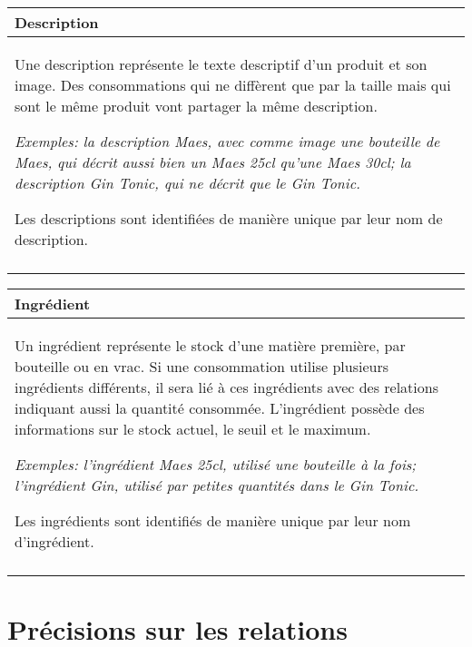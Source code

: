 \documentclass[a4paper,10pt]{article}
\begin{document}
\begin{tabu}{X}
\textbf{Description} \\
\toprule

Une description représente le texte descriptif d'un produit et son image. Des consommations qui ne diffèrent que par la taille mais qui sont le même produit vont partager la même description.

\textsl{Exemples: la description Maes, avec comme image une bouteille de Maes, qui décrit aussi bien un Maes 25cl qu'une Maes 30cl; la description Gin Tonic, qui ne décrit que le Gin Tonic.}

Les descriptions sont identifiées de manière unique par leur nom de description. \\\\
\end{tabu}

\begin{tabu}{X}
\textbf{Ingrédient} \\
\toprule

Un ingrédient représente le stock d'une matière première, par bouteille ou en vrac. Si une consommation utilise plusieurs ingrédients différents, il sera lié à ces ingrédients avec des relations indiquant aussi la quantité consommée. L'ingrédient possède des informations sur le stock actuel, le seuil et le maximum.

\textsl{Exemples: l'ingrédient Maes 25cl, utilisé une bouteille à la fois; l'ingrédient Gin, utilisé par petites quantités dans le Gin Tonic.}

Les ingrédients sont identifiés de manière unique par leur nom d'ingrédient. \\\\
\end{tabu}

\section{Précisions sur les relations}
\end{document}
